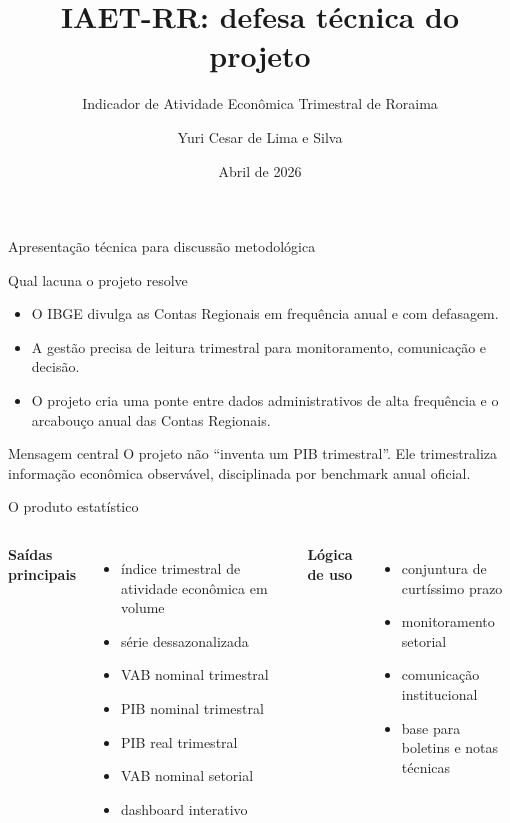 \documentclass[aspectratio=169,11pt]{beamer}
\title[IAET-RR]{IAET-RR: defesa técnica do projeto}
\subtitle{Indicador de Atividade Econômica Trimestral de Roraima}
\author{Yuri Cesar de Lima e Silva}
\institute{SEPLAN/RR -- CGEES/DIEAS}
\date{Abril de 2026}
\begin{document}
\begin{frame}[plain]
  \titlepage
  \vspace{-0.4cm}
  \begin{center}
    \small Apresentação técnica para discussão metodológica
  \end{center}
\end{frame}

\begin{frame}{Qual lacuna o projeto resolve}
\begin{itemize}
  \item O IBGE divulga as Contas Regionais em frequência anual e com defasagem.
  \item A gestão precisa de leitura trimestral para monitoramento, comunicação e decisão.
  \item O projeto cria uma ponte entre dados administrativos de alta frequência e o arcabouço anual das Contas Regionais.
\end{itemize}

\vspace{0.3cm}
\begin{block}{Mensagem central}
O projeto não ``inventa um PIB trimestral''. Ele trimestraliza informação econômica observável, disciplinada por benchmark anual oficial.
\end{block}
\end{frame}

\begin{frame}{O produto estatístico}
\begin{columns}[T]
\textbf{Saídas principais}
\begin{itemize}
  \item índice trimestral de atividade econômica em volume
  \item série dessazonalizada
  \item VAB nominal trimestral
  \item PIB nominal trimestral
  \item PIB real trimestral
  \item VAB nominal setorial
  \item dashboard interativo
\end{itemize}

\textbf{Lógica de uso}
\begin{itemize}
  \item conjuntura de curtíssimo prazo
  \item monitoramento setorial
  \item comunicação institucional
  \item base para boletins e notas técnicas
\end{itemize}
\end{columns}
\end{frame}
\end{document}
